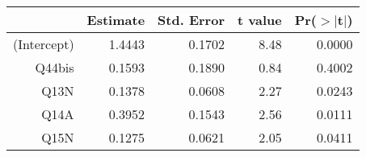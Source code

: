 \begin{table}[ht]
\centering
\begin{tabular}{rrrrr}
  \hline
 & Estimate & Std. Error & t value & Pr($>$$|$t$|$) \\ 
  \hline
(Intercept) & 1.4443 & 0.1702 & 8.48 & 0.0000 \\ 
  Q44bis & 0.1593 & 0.1890 & 0.84 & 0.4002 \\ 
  Q13N & 0.1378 & 0.0608 & 2.27 & 0.0243 \\ 
  Q14A & 0.3952 & 0.1543 & 2.56 & 0.0111 \\ 
  Q15N & 0.1275 & 0.0621 & 2.05 & 0.0411 \\ 
   \hline
\end{tabular}
\end{table}
